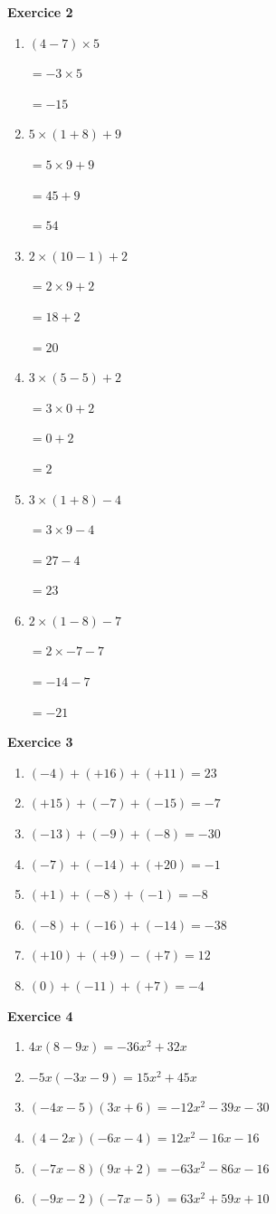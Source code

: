 \documentclass[12pt,a4paper,french]{article}
\begin{document}
\noindent\textbf{Exercice 2}\par
\smallskip
\begin{enumerate}
\item $(4 - 7) \times 5$

$= -3 \times 5$

$= -15$
\item $5 \times (1 + 8) + 9$

$= 5 \times 9 + 9$

$= 45 + 9$

$= 54$
\item $2 \times (10 - 1) + 2$

$= 2 \times 9 + 2$

$= 18 + 2$

$= 20$
\item $3 \times (5 - 5) + 2$

$= 3 \times 0 + 2$

$= 0 + 2$

$= 2$
\item $3 \times (1 + 8) - 4$

$= 3 \times 9 - 4$

$= 27 - 4$

$= 23$
\item $2 \times (1 - 8) - 7$

$= 2 \times -7 - 7$

$= -14 - 7$

$= -21$
\end{enumerate}
\medskip

\noindent\textbf{Exercice 3}\par
\smallskip
\begin{enumerate}
\item $(-4) + (+16) + (+11) = 23$
\item $(+15) + (-7) + (-15) = -7$
\item $(-13) + (-9) + (-8) = -30$
\item $(-7) + (-14) + (+20) = -1$
\item $(+1) + (-8) + (-1) = -8$
\item $(-8) + (-16) + (-14) = -38$
\item $(+10) + (+9) - (+7) = 12$
\item $(0) + (-11) + (+7) = -4$
\end{enumerate}
\medskip

\noindent\textbf{Exercice 4}\par
\smallskip
\begin{enumerate}
\item $4x(8 - 9x) = -36x^2 + 32x$
\item $-5x(-3x - 9) = 15x^2 + 45x$
\item $(-4x - 5)(3x + 6) = -12x^2 - 39x - 30$
\item $(4 - 2x)(-6x - 4) = 12x^2 - 16x - 16$
\item $(-7x - 8)(9x + 2) = -63x^2 - 86x - 16$
\item $(-9x - 2)(-7x - 5) = 63x^2 + 59x + 10$
\end{enumerate}
\medskip
\end{document}
